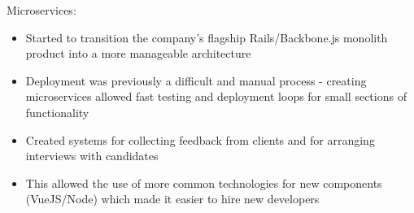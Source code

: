 \item Microservices:
\begin{itemize}%
    \item Started to transition the company's flagship Rails/Backbone.js monolith product into a more manageable architecture
    \item Deployment was previously a difficult and manual process - creating microservices allowed fast testing and deployment loops for small sections of functionality
    \item Created systems for collecting feedback from clients and for arranging interviews with candidates
    \item This allowed the use of more common technologies for new components (VueJS/Node) which made it easier to hire new developers
\end{itemize}
